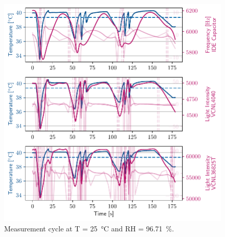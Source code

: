 \begin{figure}[ht]
    \centering
    \includegraphics{graphs/t40rh96.7.pdf}
    \caption{Measurement cycle at T = \qty{25}{\celsius} and RH = \qty{96.71}{\percent}.}
\end{figure}
